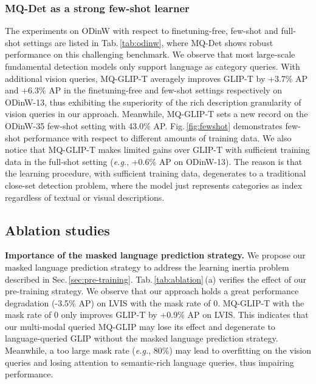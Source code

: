 \subsubsection{MQ-Det as a strong few-shot learner}
The experiments on ODinW with respect to finetuning-free, few-shot and full-shot settings are listed in Tab.\,\ref{tab:odinw}, where MQ-Det shows robust performance on this challenging benchmark. We observe that most large-scale fundamental detection models only support language as category queries. With additional vision queries, MQ-GLIP-T averagely improves GLIP-T by +3.7\% AP and +6.3\% AP in the finetuning-free and few-shot settings respectively on ODinW-13, thus exhibiting the superiority of the rich description granularity of vision queries in our approach. 
Meanwhile, MQ-GLIP-T sets a new record on the ODinW-35 few-shot setting with 43.0\% AP. Fig.\,\ref{fig:fewshot} demonstrates few-shot performance with respect to different amounts of training data. We also notice that MQ-GLIP-T makes limited gains over GLIP-T with sufficient training data in the full-shot setting (\emph{e.g.}, +0.6\% AP on ODinW-13). The reason is that the learning procedure, with sufficient training data, degenerates to a traditional close-set detection problem, where the model just represents categories as index regardless of textual or visual descriptions.



\subsection{Ablation studies}
\label{sec:ablation}

\textbf{Importance of the masked language prediction strategy.}
\label{sec:exp_mask}
We propose our masked language prediction strategy to address the learning inertia problem described in Sec.\,\ref{sec:pre-training}. Tab.\,\ref{tab:ablation}\,(a) verifies the effect of our pre-training strategy.
We observe that our approach holds a great performance degradation (-3.5\% AP) on LVIS with the mask rate of 0.  MQ-GLIP-T with the mask rate of 0 only improves GLIP-T by +0.9\% AP on LVIS. 
This indicates that our multi-modal queried MQ-GLIP may lose its effect and degenerate to language-queried GLIP without the  masked language prediction strategy. 
Meanwhile, a too large mask rate (\emph{e.g.}, 80\%) may lead to overfitting on the vision queries and losing attention to semantic-rich language queries, thus impairing performance. 



